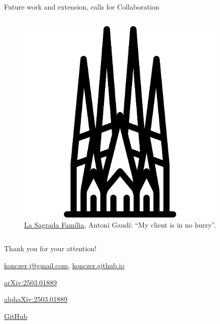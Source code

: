 \documentclass{beamer}
\theoremstyle{definition}
\begin{document}
\begin{frame}[shrink=15]{Future work and extension, calls for Collaboration}
\begin{columns}
\begin{column}{0.3\textwidth}
    \begin{figure}
    \centering
        \includegraphics[width=0.9\textwidth]{img/logos/SagradaFamilia.pdf}
        \caption{\small \centering  \href{https://boutique.arte.tv/detail/sagrada-familia-le-defi-de-gaudi}{La Sagrada Família}, Antoni Gaudí: ``My client is in no hurry''.}
    \end{figure}
\end{column}
        

\end{columns}

\end{frame}

\begin{frame}{}

\centering \Huge
  {Thank you for your attention!}

    \vspace{0.85 cm}
    

    \vspace{0.85 cm}

    {\large
  \href{mailto:konczer.j@gmail.com}{konczer.j@gmail.com},
        \href{https://konczer.github.io/}{konczer.github.io}
        
        \vspace{0.3 cm}
        
        \href{https://arxiv.org/abs/2503.01889}{arXiv:2503.01889}
        
        \href{https://www.alphaxiv.org/abs/2503.01889}{alphaXiv:2503.01889}

        \href{https://github.com/Konczer/UncertaintyTheory/tree/main/ExtendedEqilibrium}{GitHub}
     }   
  
\end{frame}
\end{document}
